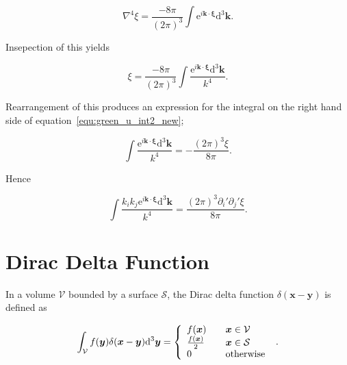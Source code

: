\documentclass[12pt]{article}
\begin{document}
\begin{equation}
\label{equ:del4_int}
\nabla^{4} \xi = \frac{-8 \pi}{(2 \pi)^{3}} \int \mathrm{e}^{i \boldsymbol{k} \cdot \boldsymbol{\xi}} \mathrm{d}^{3} \boldsymbol{k} .
\end{equation}

Insepection of this yields

\begin{equation}
\label{equ:del4_int_int}
\xi = \frac{-8 \pi}{(2 \pi)^{3}} \int \frac{\mathrm{e}^{i \boldsymbol{k} \cdot \boldsymbol{\xi}} \mathrm{d}^{3} \boldsymbol{k}}{k^{4}} .
\end{equation}

Rearrangement of this produces an expression for the integral on the right hand side of equation~\ref{equ:green_u_int2_new};

\begin{equation}
\label{equ:green_u_int2_new_express}
\int \frac{\mathrm{e}^{i \boldsymbol{k} \cdot \boldsymbol{\xi}} \mathrm{d}^{3} \boldsymbol{k}}{k^{4}} = -\frac{(2 \pi)^{3} \xi}{8 \pi} .
\end{equation}

Hence

\begin{equation}
\label{equ:green_u_int2}
\int \frac{k_{i} k_{j} \mathrm{e}^{i \boldsymbol{k} \cdot \boldsymbol{\xi}} \mathrm{d}^{3} \boldsymbol{k}}{k^{4}} = \frac{(2 \pi)^{3} \partial_{i}' \partial_{j}' \xi}{8 \pi} .
\end{equation}

\section{Dirac Delta Function}
\label{app:delta}

In a volume $\mathcal{V}$ bounded by a surface $\mathcal{S}$, the Dirac delta function $\delta(\boldsymbol{x} - \boldsymbol{y})$ is defined as \citep{Riley06}

\begin{equation}
\label{equ:dirac}
\int_{\mathcal{V}} f(\boldsymbol{y}) \delta(\boldsymbol{x} - \boldsymbol{y}) \mathrm{d}^{3} \boldsymbol{y} = \left\{
    \begin{array}{l l}
      f(\boldsymbol{x}) &\quad \boldsymbol{x} \in \mathcal{V} \\
      \frac{f(\boldsymbol{x})}{2} &\quad \boldsymbol{x} \in \mathcal{S} \\
      0 & \quad \text{otherwise}
\end{array}
\right.\ .
\end{equation}
\end{document}
